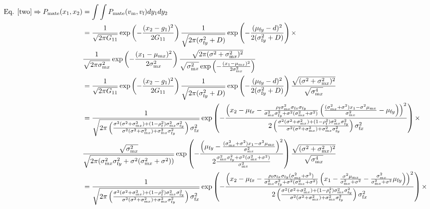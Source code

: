 \documentclass{article}
\newcommand{\x}[1]{\text{#1}}
\begin{document}
\begin{align*}
\hspace{-20pt}\text{Eq. \ref{two}}\Rightarrow P_\text{mate}(x_1,x_2)&=\int \int P_\text{mate}(v_\x{m},v_\x{f})dy_1dy_2
\\&=\frac{1}{\sqrt{2\pi G_{11}}}\exp\left(-\frac{(x_2-g_1)^2}{2G_{11}}\right)\frac{1}{\sqrt{2\pi(\sigma_{\x{f}y}^2+D)}}\exp\left(-\frac{(\mu_{\x{f}y}-d)^2}{2(\sigma_{\x{f}y}^2+D)}\right)\times
\\&\frac{1}{\sqrt{2\pi\sigma_{\x{m}x}^2}}\exp\left(-\frac{(x_1-\mu_{\x{m}x})^2}{2\sigma_{\x{m}x}^2}\right)\frac{\sqrt{2\pi(\sigma^2+\sigma_{\x{m}x}^2)^2}}{\sqrt{\sigma_{\x{m}x}^2}\exp\left(-\frac{(x_1-\mu_{\x{m}x})^2}{2\sigma_{\x{m}x}^2}\right)}
\\&=\frac{1}{\sqrt{2\pi G_{11}}}\exp\left(-\frac{(x_2-g_1)^2}{2G_{11}}\right)\frac{1}{\sqrt{2\pi(\sigma_{\x{f}y}^2+D)}}\exp\left(-\frac{(\mu_{\x{f}y}-d)^2}{2(\sigma_{\x{f}y}^2+D)}\right)\frac{\sqrt{(\sigma^2+\sigma_{\x{m}x}^2)^2}}{\sqrt{\sigma_{\x{m}x}^4}}
\\&=\frac{1}{\sqrt{2\pi \left(\frac{\sigma^2(\sigma^2+\sigma_{\x{m}x}^2)+(1-\rho_\x{f}^2)\sigma_{\x{m}x}^2\sigma_{\x{f}y}^2}{\sigma^2(\sigma^2+\sigma_{\x{m}x}^2)+\sigma_{\x{m}x}^2\sigma_{\x{f}y}^2}\right)\sigma_{\x{f}x}^2}}\exp\left(-\frac{\left(x_2-\mu_{\x{f}x}-\frac{\rho_\x{f}\sigma_{\x{m}x}^2\sigma_{\x{f}x}\sigma_{\x{f}y}}{\sigma_{\x{m}x}^2\sigma_{\x{f}y}^2+\sigma^2(\sigma_{\x{m}x}^2+\sigma^2)}\left(\frac{(\sigma_{\x{m}x}^2+\sigma^2)x_1-\sigma^2\mu_{\x{m}x}}{\sigma_{\x{m}x}^2}-\mu_{\x{f}y}\right)\right)^2}{2\left(\frac{\sigma^2(\sigma^2+\sigma_{\x{m}x}^2)+(1-\rho_\x{f}^2)\sigma_{\x{m}x}^2\sigma_{\x{f}y}^2}{\sigma^2(\sigma^2+\sigma_{\x{m}x}^2)+\sigma_{\x{m}x}^2\sigma_{\x{f}y}^2}\right)\sigma_{\x{f}x}^2}\right)\times
\\&\frac{\sqrt{\sigma_{\x{m}x}^2}}{\sqrt{2\pi(\sigma_{\x{m}x}^2\sigma_{\x{f}y}^2+\sigma^2(\sigma_{\x{m}x}^2+\sigma^2))}}\exp\left(-\frac{\left(\mu_{\x{f}y}-\frac{(\sigma_{\x{m}x}^2+\sigma^2)x_1-\sigma^2\mu_{\x{m}x}}{\sigma_{\x{m}x}^2}\right)^2}{2\frac{\sigma_{\x{m}x}^2\sigma_{\x{f}y}^2+\sigma^2(\sigma_{\x{m}x}^2+\sigma^2)}{\sigma_{\x{m}x}^2}}\right)\frac{\sqrt{(\sigma^2+\sigma_{\x{m}x}^2)^2}}{\sqrt{\sigma_{\x{m}x}^4}}
\\&=\frac{1}{\sqrt{2\pi \left(\frac{\sigma^2(\sigma^2+\sigma_{\x{m}x}^2)+(1-\rho_\x{f}^2)\sigma_{\x{m}x}^2\sigma_{\x{f}y}^2}{\sigma^2(\sigma^2+\sigma_{\x{m}x}^2)+\sigma_{\x{m}x}^2\sigma_{\x{f}y}^2}\right)\sigma_{\x{f}x}^2}}\exp\left(-\frac{\left(x_2-\mu_{\x{f}x}-\frac{\rho_\x{f}\sigma_{\x{f}x}\sigma_{\x{f}y}(\sigma_{\x{m}x}^2+\sigma^2)}{\sigma_{\x{m}x}^2\sigma_{\x{f}y}^2+\sigma^2(\sigma_{\x{m}x}^2+\sigma^2)}\left(x_1-\frac{\sigma^2\mu_{\x{m}x}}{\sigma_{\x{m}x}^2+\sigma^2}-\frac{\sigma_{\x{m}x}^2}{\sigma_{\x{m}x}^2+\sigma^2}\mu_{\x{f}y}\right)\right)^2}{2\left(\frac{\sigma^2(\sigma^2+\sigma_{\x{m}x}^2)+(1-\rho_\x{f}^2)\sigma_{\x{m}x}^2\sigma_{\x{f}y}^2}{\sigma^2(\sigma^2+\sigma_{\x{m}x}^2)+\sigma_{\x{m}x}^2\sigma_{\x{f}y}^2}\right)\sigma_{\x{f}x}^2}\right)\times

\end{align*}
\end{document}
